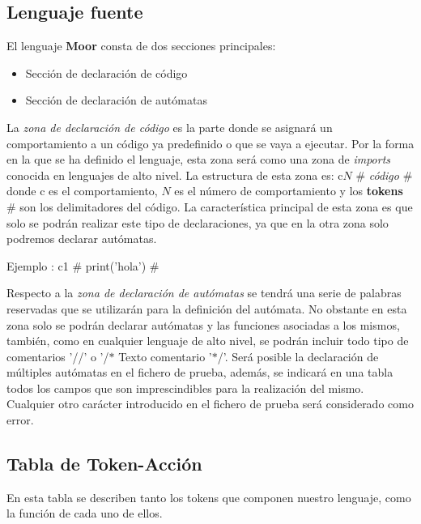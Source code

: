 \documentclass[12pt,a4paper]{article}
\begin{document}
\subsection{Lenguaje fuente}
El lenguaje \textbf{Moor} consta de dos secciones principales:

\begin{itemize}
	\item Sección de declaración de código
	\item Sección de declaración de autómatas
\end{itemize}

La \textit{zona de declaración de código} es la parte donde se asignará un comportamiento a un código ya predefinido o que se vaya a ejecutar. Por la forma en la que se ha definido el lenguaje, esta zona será como una zona de \textit{imports} conocida en lenguajes de alto nivel. 
\newline
\newline
La estructura de esta zona es: c$N$ $\#$ \textit{código} $\#$
 donde c es el comportamiento, $N$ es el número de comportamiento y los \textbf{tokens} $\#$ son los delimitadores del código. \newline La característica principal de esta zona es que solo se podrán realizar este tipo de declaraciones, ya que en la otra zona solo podremos declarar autómatas.

\begin{center}
	Ejemplo : c1 $\#$ print('hola') $\#$
\end{center}

Respecto a la \textit{zona de declaración de autómatas} se tendrá una serie de palabras reservadas que se utilizarán para la definición del autómata. No obstante en esta zona solo se podrán declarar autómatas y las funciones asociadas a los mismos, también, como en cualquier lenguaje de alto nivel, se podrán incluir todo tipo de  comentarios '//' o '/$\ast$ Texto comentario '$\ast$/'.
\newline 
\newline
Será posible la declaración de múltiples autómatas en el fichero de prueba, además, se indicará en una tabla todos los campos que son imprescindibles para la realización del mismo.
Cualquier otro carácter introducido en el fichero de prueba será considerado como error.

\subsection{Tabla de Token-Acción}
 En esta tabla se describen tanto los tokens que componen nuestro lenguaje, como la función de cada uno de ellos.
\end{document}
